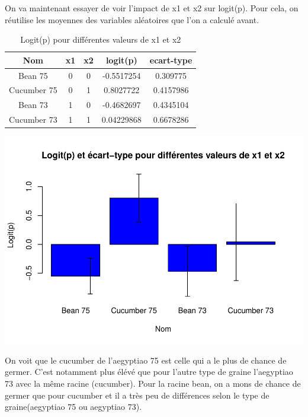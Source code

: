 \documentclass[
]{article}
\begin{document}
On va maintenant essayer de voir l'impact de x1 et x2 sur logit(p). Pour
cela, on réutilise les moyennes des variables aléatoires que l'on a
calculé avant.

\begin{table}[h]
\centering
\small
\begin{tabular}{|c|c|c|c|c|}
\hline
\textbf{Nom} & \textbf{x1} & \textbf{x2} & \textbf{logit(p)} & \textbf{ecart-type}\\
\hline
Bean 75 & 0 & 0 & -0.5517254 & 0.309775 \\
Cucumber 75 & 0 & 1 & 0.8027722 & 0.4157986 \\
Bean 73 & 1 & 0 & -0.4682697 & 0.4345104 \\
Cucumber 73 & 1 & 1 & 0.04229868 & 0.6678286 \\
\hline
\end{tabular}
\caption{Logit(p) pour différentes valeurs de x1 et x2}
\label{tab:tableau_combine}
\end{table}

\begin{center}\includegraphics{projet1---rapport_files/figure-latex/unnamed-chunk-2-1} \end{center}

On voit que le cucumber de l'aegyptiao 75 est celle qui a le plus de
chance de germer. C'est notamment plus élévé que pour l'autre type de
graine l'aegyptiao 73 avec la même racine (cucumber). Pour la racine
bean, on a mons de chance de germer que pour cucumber et il a très peu
de différences selon le type de graine(aegyptiao 75 ou aegyptiao 73).
\end{document}
